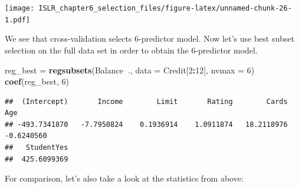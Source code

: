 \documentclass[
]{article}
\newenvironment{Shaded}{\begin{snugshade}}{\end{snugshade}}
\newcommand{\DataTypeTok}[1]{\textcolor[rgb]{0.13,0.29,0.53}{#1}}
\newcommand{\DecValTok}[1]{\textcolor[rgb]{0.00,0.00,0.81}{#1}}
\newcommand{\KeywordTok}[1]{\textcolor[rgb]{0.13,0.29,0.53}{\textbf{#1}}}
\newcommand{\NormalTok}[1]{#1}
\newcommand{\OperatorTok}[1]{\textcolor[rgb]{0.81,0.36,0.00}{\textbf{#1}}}
\newcommand{\StringTok}[1]{\textcolor[rgb]{0.31,0.60,0.02}{#1}}
\begin{document}
\texttt{[image: ISLR\_chapter6\_selection\_files/figure-latex/unnamed-chunk-26-1.pdf]}

We see that cross-validation selects 6-predictor model. Now let's use
best subset selection on the full data set in order to obtain the
6-predictor model.

\begin{Shaded}
\begin{Highlighting}[]
\NormalTok{reg_best =}\StringTok{ }\KeywordTok{regsubsets}\NormalTok{(Balance}\OperatorTok{~}\NormalTok{., }\DataTypeTok{data =}\NormalTok{ Credit[}\DecValTok{2}\OperatorTok{:}\DecValTok{12}\NormalTok{], }\DataTypeTok{nvmax =} \DecValTok{6}\NormalTok{)}
\KeywordTok{coef}\NormalTok{(reg_best, }\DecValTok{6}\NormalTok{)}
\end{Highlighting}
\end{Shaded}

\begin{verbatim}
##  (Intercept)       Income        Limit       Rating        Cards          Age 
## -493.7341870   -7.7950824    0.1936914    1.0911874   18.2118976   -0.6240560 
##   StudentYes 
##  425.6099369
\end{verbatim}

For comparison, let's also take a look at the statistics from above:
\end{document}
